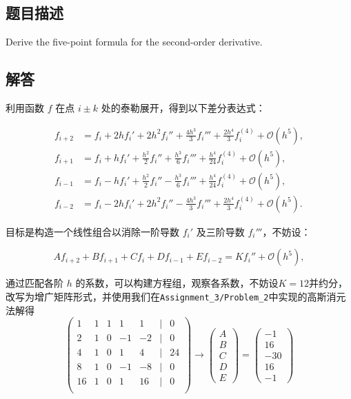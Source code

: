 \subsection{题目描述}
\noindent Derive the five-point formula for the second-order derivative.

\subsection{解答}
利用函数 \( f \) 在点 \( i \pm k \) 处的泰勒展开，得到以下差分表达式：

\[
\begin{aligned}
f_{i+2} &= f_i + 2 h f_i' + 2 h^2 f_i'' + \frac{4 h^3}{3} f_i''' + \frac{2 h^4}{3} f_i^{(4)} + \mathcal{O}(h^5), \\
f_{i+1} &= f_i + h f_i' + \frac{h^2}{2} f_i'' + \frac{h^3}{6} f_i''' + \frac{h^4}{24} f_i^{(4)} + \mathcal{O}(h^5), \\
f_{i-1} &= f_i - h f_i' + \frac{h^2}{2} f_i'' - \frac{h^3}{6} f_i''' + \frac{h^4}{24} f_i^{(4)} + \mathcal{O}(h^5), \\
f_{i-2} &= f_i - 2 h f_i' + 2 h^2 f_i'' - \frac{4 h^3}{3} f_i''' + \frac{2 h^4}{3} f_i^{(4)} + \mathcal{O}(h^5).
\end{aligned}
\]

目标是构造一个线性组合以消除一阶导数 \( f_i' \) 及三阶导数 \( f_i''' \)，不妨设：

\[
A f_{i+2} + B f_{i+1} + C f_i + D f_{i-1} + E f_{i-2} = K f_i'' + \mathcal{O}(h^5),
\]

通过匹配各阶 \( h \) 的系数，可以构建方程组，观察各系数，不妨设\( K = 12 \)并约分，改写为增广矩阵形式，并使用我们在\texttt{Assignment\_3/Problem\_2}中实现的高斯消元法解得
\[
\begin{pmatrix}
1 & 1 & 1 & 1 & 1 & | & 0 \\
2 & 1 & 0 & -1 & -2 & | & 0 \\
4 & 1 & 0 & 1 & 4 & | & 24 \\
8 & 1 & 0 & -1 & -8 & | & 0 \\
16 & 1 & 0 & 1 & 16 & | & 0 \\
\end{pmatrix}
\rightarrow
\begin{pmatrix}
A \\
B \\
C \\
D \\
E 
\end{pmatrix}
= 
\begin{pmatrix}
-1 \\
16 \\
-30 \\
16 \\
-1
\end{pmatrix}
\]

